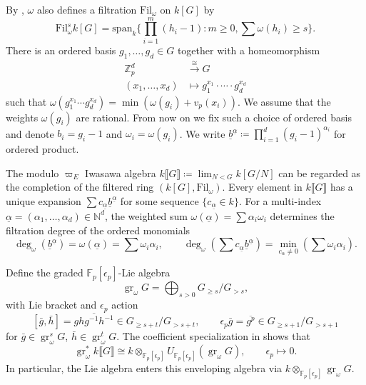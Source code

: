 \documentclass[11pt]{article}
\theoremstyle{definition}
\newcommand{\gr}{\operatorname{gr}}
\begin{document}
By \cite[III, \S2.3.6]{Lazard1965}, $\omega$ also defines a filtration $\mathrm{Fil}_\omega$ on $k[G]$ by
\[\mathrm{Fil}_{\omega}^sk[G]=\mathrm{span}_k\{\prod_{i=1}^m(h_i-1): m\ge0, \sum\omega(h_i)\ge s\}.\]
There is an ordered basis $g_1,\dots, g_d\in G$ together with a homeomorphism
\[\begin{aligned}
\mathbb{Z}_p^d&\xrightarrow{\cong}G\\
(x_1,\dots,x_d)&\mapsto g_1^{x_1}\cdot\cdots\cdot g_d^{x_d}
\end{aligned}\]
such that $\omega(g_1^{x_1}\cdots g_d^{x_d})=\min(\omega(g_i)+v_p(x_i))$. We assume that the weights $\omega(g_i)$ are rational.
From now on we fix such a choice of ordered basis and denote $b_i=g_i-1$ and $\omega_i=\omega(g_i)$. We write $\underline{b}^{\underline{\alpha}}\coloneqq\prod_{i=1}^{d}(g_i-1)^{\alpha_i}$ for ordered product. 

The modulo $\varpi_E$ Iwasawa algebra $k\llbracket G\rrbracket\coloneqq\lim_{N<G}k[G/N]$ can be regarded as the completion of the filtered ring $(k[G], \mathrm{Fil}_\omega)$. 
Every element in $k\llbracket G\rrbracket$ has a unique expansion $\sum c_{\underline\alpha}\underline b^{\underline{\alpha}}$ for some sequence $\{c_{\underline\alpha}\in k\}$.
For a multi-index $\underline \alpha=(\alpha_1,\dots,\alpha_d)\in\mathbb{N}^d$, the weighted sum $\omega(\underline\alpha)=\sum\alpha_i\omega_i$ determines the filtration degree of the ordered monomials
\[    \deg_\omega(\underline{b}^{\underline{\alpha}})=\omega(\underline\alpha)=\sum\omega_i\alpha_i,\qquad
      \deg_\omega(\sum c_{\underline\alpha}\underline b^{\underline{\alpha}})=\min_{c_\alpha\neq0}(\sum\omega_i\alpha_i).\]

Define the graded $\mathbb F_p[\epsilon_p]$-Lie algebra
\[
 \gr_\omega G=\bigoplus_{s>0}G_{\geq s}/G_{>s},
\]
with Lie bracket and $\epsilon_p$ action
\[
 [\bar g,\bar h]=\overline{ghg^{-1}h^{-1}}
       \in G_{\geq s+t}/G_{>s+t},\qquad
 \epsilon_p\bar g=\overline{g^p}
       \in G_{\geq s+1}/G_{>s+1}
\]
for $\bar g\in\gr_\omega^sG$, $\bar h\in\gr_\omega^tG$.
The coefficient specialization in \cite[\S3.4, Remark~3.1]{Sorgdrager2026}
shows that
\[
 \gr_\omega^*k\llbracket G\rrbracket
 \cong k\otimes_{\mathbb F_p[\epsilon_p]}
       U_{\mathbb F_p[\epsilon_p]}(\gr_\omega G),
 \qquad \epsilon_p\longmapsto0.
\]
In particular, the Lie algebra enters this enveloping algebra via
$k\otimes_{\mathbb F_p[\epsilon_p]}\gr_\omega G$.
\end{document}
